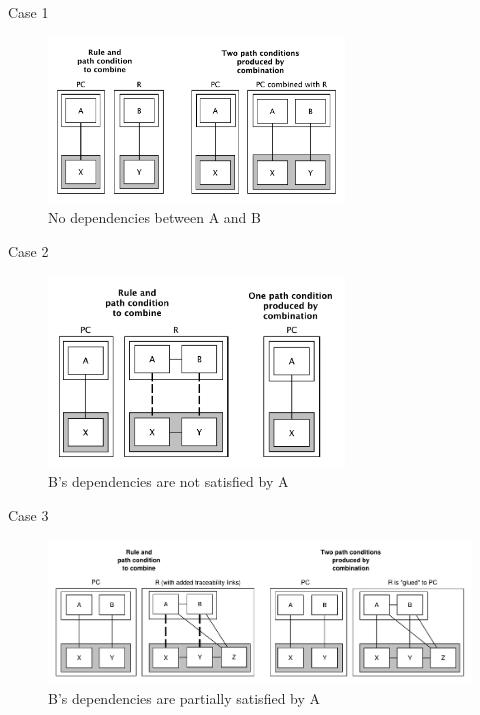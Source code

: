 \documentclass[xcolor=dvipsnames, 14pt]{beamer}
\begin{document}
\begin{frame}{Case 1}
\begin{figure}[h!] \centering \includegraphics[width=0.7\textwidth]{../figures/building_path_conditions/no_dependencies.pdf}
	\caption{No dependencies between A and B}
	\label{fig:no_dependencies}
\end{figure}
\end{frame}

\begin{frame}{Case 2}
\begin{figure}[h!] \centering \includegraphics[width=0.7\textwidth]{../figures/building_path_conditions/non_satisfied_dependencies.pdf}
	\caption{B's dependencies are not satisfied by A}
	\label{fig:non_satisfied_dependencies}
\end{figure}
\end{frame}

\begin{frame}{Case 3}
\begin{figure}[h!] \centering \includegraphics[width=\textwidth]{../figures/building_path_conditions/partial_satisfied_dependencies.pdf}
	\caption{B's dependencies are partially satisfied by A}
	\label{fig:partial_satisfied_dependencies}
\end{figure}
\end{frame}
\end{document}
